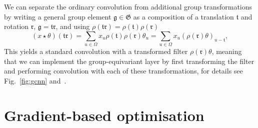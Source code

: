 We can separate the ordinary convolution from additional group transformations by writing a general group element $\mathfrak{g} \in \mathfrak{G}$ as a composition of a translation $\mathfrak{t}$ and rotation $\mathfrak{r}$, $\mathfrak g = \mathfrak{tr}$, and using  $\rho(\mathfrak{t r})=\rho(\mathfrak{t}) \rho(\mathfrak{r})$
\begin{equation}
	(x \star \theta)(\mathfrak{t r}) =\sum_{u \in \Omega} x_{u} \rho(\mathfrak{t}) \rho(\mathfrak{r}) \theta_{u} =\sum_{u \in \Omega} x_{u}(\rho(\mathfrak{r}) \theta)_{u-\mathfrak{t}},
\end{equation}
This yields a standard convolution with a transformed filter $\rho(\mathfrak{r})\theta$, meaning that we can implement the group-equivariant layer by first transforming the filter and performing convolution with each of these transformations, for details see Fig.~\ref{fig:gcnn} and~\cite{cohen2016group}.

\section{Gradient-based optimisation}
\label{sec:gbopt}

